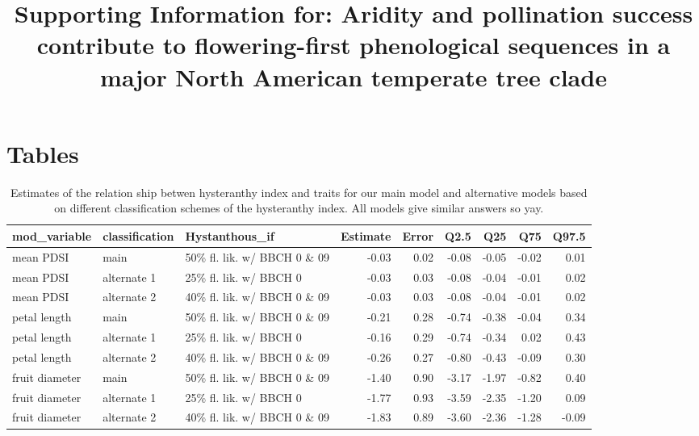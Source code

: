 \documentclass{article}[11pt]
\title{Supporting Information for: Aridity and pollination success contribute to flowering-first phenological sequences in a major North American temperate tree clade}
\date{}
\begin{document}

\maketitle

\section*{Tables}
\begin{table}[ht]
\centering
\begin{tabular}[width=.8\textwidth]{|lllrrrrrr|}
  \hline
  mod\_variable & classification & Hystanthous\_if & Estimate & Error & Q2.5 & Q25 & Q75 & Q97.5 \\ 
  \hline
 mean PDSI & main & 50\% fl. lik. w/ BBCH 0 \& 09 & -0.03 & 0.02 & -0.08 & -0.05 & -0.02 & 0.01 \\ 
   mean PDSI & alternate 1 & 25\% fl. lik. w/ BBCH 0 & -0.03 & 0.03 & -0.08 & -0.04 & -0.01 & 0.02 \\ 
  mean PDSI & alternate 2 & 40\% fl. lik. w/ BBCH 0 \& 09 & -0.03 & 0.03 & -0.08 & -0.04 & -0.01 & 0.02 \\ 
  \hline
   petal length & main & 50\% fl. lik.  w/ BBCH 0 \& 09 & -0.21 & 0.28 & -0.74 & -0.38 & -0.04 & 0.34 \\ 
  petal length & alternate 1 & 25\% fl. lik. w/ BBCH 0 & -0.16 & 0.29 & -0.74 & -0.34 & 0.02 & 0.43 \\ 
  petal length & alternate 2 & 40\% fl. lik. w/ BBCH 0 \& 09 & -0.26 & 0.27 & -0.80 & -0.43 & -0.09 & 0.30 \\ 
 \hline
 fruit diameter & main & 50\% fl. lik.  w/ BBCH 0 \& 09 & -1.40 & 0.90 & -3.17 & -1.97 & -0.82 & 0.40 \\ 
  fruit diameter & alternate 1 & 25\% fl. lik. w/ BBCH 0 & -1.77 & 0.93 & -3.59 & -2.35 & -1.20 & 0.09 \\ 
  fruit diameter & alternate 2 & 40\% fl. lik. w/ BBCH 0 \& 09 & -1.83 & 0.89 & -3.60 & -2.36 & -1.28 & -0.09 \\ 
   \hline
\end{tabular}
\caption{Estimates of the relation ship betwen hysteranthy index and traits for our main model and alternative models based on different classification schemes of the hysteranthy index. All models give similar answers so yay.}
\label{tab:modput}
\end{table}
\pagebreak
\end{document}
